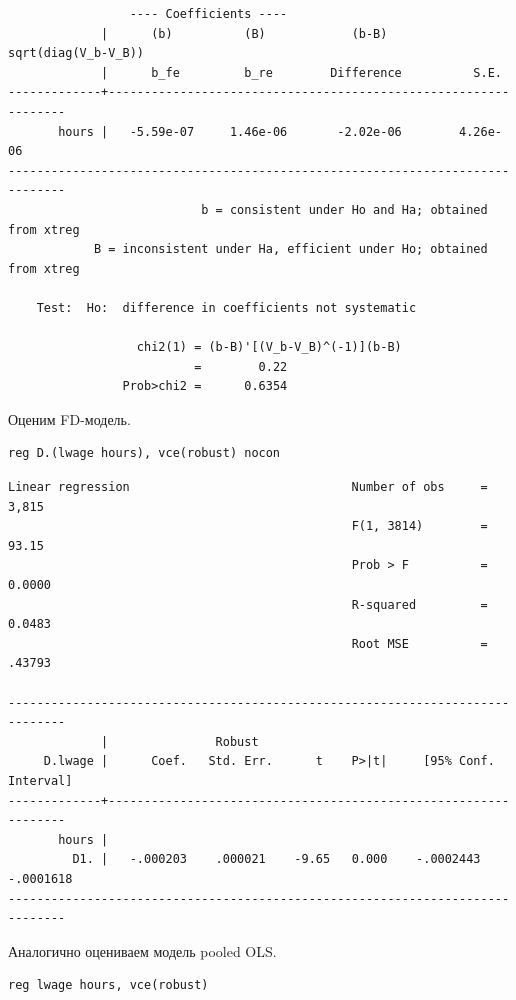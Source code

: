 \documentclass[]{book}
\begin{document}
\begin{verbatim}
                 ---- Coefficients ----
             |      (b)          (B)            (b-B)     sqrt(diag(V_b-V_B))
             |      b_fe         b_re        Difference          S.E.
-------------+----------------------------------------------------------------
       hours |   -5.59e-07     1.46e-06       -2.02e-06        4.26e-06
------------------------------------------------------------------------------
                           b = consistent under Ho and Ha; obtained from xtreg
            B = inconsistent under Ha, efficient under Ho; obtained from xtreg

    Test:  Ho:  difference in coefficients not systematic

                  chi2(1) = (b-B)'[(V_b-V_B)^(-1)](b-B)
                          =        0.22
                Prob>chi2 =      0.6354
\end{verbatim}

Оценим FD-модель.

\begin{verbatim}
reg D.(lwage hours), vce(robust) nocon
\end{verbatim}

\begin{verbatim}
Linear regression                               Number of obs     =      3,815
                                                F(1, 3814)        =      93.15
                                                Prob > F          =     0.0000
                                                R-squared         =     0.0483
                                                Root MSE          =     .43793

------------------------------------------------------------------------------
             |               Robust
     D.lwage |      Coef.   Std. Err.      t    P>|t|     [95% Conf. Interval]
-------------+----------------------------------------------------------------
       hours |
         D1. |   -.000203    .000021    -9.65   0.000    -.0002443   -.0001618
------------------------------------------------------------------------------
\end{verbatim}

Аналогично оцениваем модель pooled OLS.

\begin{verbatim}
reg lwage hours, vce(robust)
\end{verbatim}
\end{document}
